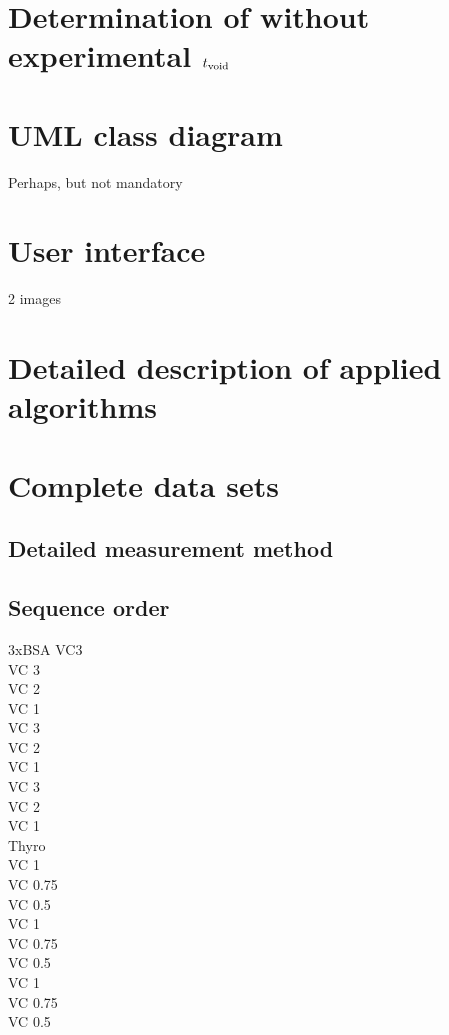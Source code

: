 \section*{Determination of without experimental $t_\text{void}$}



\section*{UML class diagram}
Perhaps, but not mandatory

\section*{User interface}

2 images 
\clearpage
\section*{Detailed description of applied algorithms}


    
\section*{Complete data sets}

\subsection*{Detailed measurement method}
\subsection*{Sequence order}
3xBSA VC3\\
VC 3\\
VC 2\\
VC 1\\
VC 3\\
VC 2\\
VC 1\\
VC 3\\
VC 2\\
VC 1\\
Thyro\\
VC 1\\
VC 0.75\\
VC 0.5\\
VC 1\\
VC 0.75\\
VC 0.5\\
VC 1\\
VC 0.75\\
VC 0.5\\
\printbibliography


